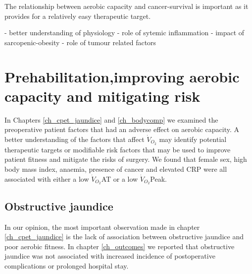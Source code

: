 The relationship between aerobic capacity and cancer-survival is important as it provides for a relatively easy therapeutic target.


- better understanding of physiology
- role of sytemic inflammation \parencite{van_heek_hospital_2005, ho_effect_2003, birkmeyer_surgeon_2003, halm_is_2002}
- impact of sarcopenic-obesity \parencite{joglekar_sarcopenia_2015, reisinger_sarcopenia_2015, gonzalez_obesity_2014}
- role of tumour related factors \parencite{williams_surgical_2014}


\section{Prehabilitation,improving aerobic capacity and mitigating risk}
In Chapters \ref{ch_cpet_jaundice} and \ref{ch_bodycomp} we examined the preoperative patient factors that had an adverse effect on aerobic capacity.
A better understanding of the factors that affect $\dot{V}_{O_2}$ may identify potential therapeutic targets or modifiable risk factors that may be used to improve patient fitness and mitigate the risks of surgery.
We found that female sex, high body mass index, anaemia, presence of cancer and elevated CRP were all associated with either a low $\dot{V}_{O_2}$AT or a low $\dot{V}_{O_2}$Peak.

\subsection{Obstructive jaundice}
In our opinion, the most important observation made in chapter \ref{ch_cpet_jaundice} is the lack of association between obstructive jaundice and poor aerobic fitness. 
In chapter \ref{ch_outcomes} we reported that obstructive jaundice was not associated with increased incidence of postoperative complications or prolonged hospital stay. 

